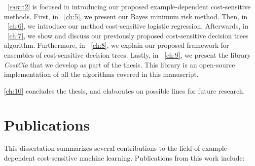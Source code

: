 \partname{~\textsc{\ref{part:2}}} is focused in introducing our proposed example-dependent 
cost-sensitive methods. First, in \chaptername{~\ref{ch:5}}, we present our Bayes minimum risk 
method. Then, in \chaptername{~\ref{ch:6}}, we introduce our method cost-sensitive logistic 
regression. Afterwards, in \chaptername{~\ref{ch:7}}, we show and discuss our previously proposed 
cost-sensitive decision trees algorithm. Furthermore, in \chaptername{~\ref{ch:8}}, we explain our 
proposed framework for ensembles of cost-sensitive decision trees. Lastly, in 
\chaptername{~\ref{ch:9}}, we present the library \mbox{\textit{CostCla}} that we develop as part of 
the thesis. This library is an open-source implementation of all the algorithms covered in this 
manuscript.

\chaptername{ \ref{ch:10}} concludes the thesis, and elaborates on possible lines for future 
research.

\section{Publications}

This dissertation summarizes several contributions to the field of example-dependent 
cost-sensitive machine learning. Publications from this work include:
\bigskip

